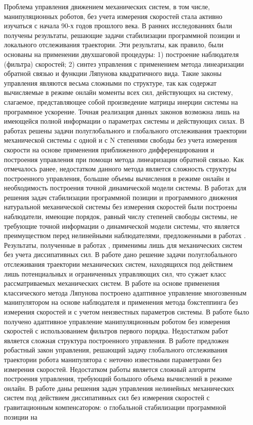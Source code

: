 {	Проблема управления движением механических систем, в том числе, манипуляционных роботов, без учета измерения скоростей стала активно изучаться с начала 90-х годов прошлого века. В ранних исследованиях \cite{nicosia90, berghuis91, kelly93, berghuis93_1, berghuis93_2} были получены результаты, решающие задачи стабилизации программной позиции и локального отслеживания траектории. Эти результаты, как правило, были основаны на применении двухшаговой процедуры: 1) построение наблюдателя (фильтра) скоростей; 2) синтез управления с применением метода линеаризации обратной связью и функции Ляпунова квадратичного вида. Такие законы управления являются весьма сложными по структуре, так как содержат вычисляемые в режиме онлайн моменты всех сил, действующих на систему, слагаемое, представляющее собой произведение матрицы инерции системы на программное ускорение. Точная реализация данных законов возможна лишь на имеющейся полной информации о параметрах системы и действующих силах. В работах \cite{loria95, loria96} решены задачи полуглобального и глобального отслеживания траектории механической системы с одной и с N степенями свободы без учета измерения скорости на основе применения приближенного дифференцирования и построения управления при помощи метода линеаризации обратной связью. Как отмечалось ранее, недостатком данного метода является сложность структуры построенного управления, большие объемы вычисления в режиме онлайн и необходимость построения точной динамической модели системы. В работах \cite{burkov95, burkov98} для решения задач стабилизации программной позиции и программного движения натуральной механической системы без измерения скоростей были построены наблюдатели, имеющие порядок, равный числу степеней свободы системы, не требующие точной информации о динамической модели системы, что является преимуществом перед нелинейными наблюдателями, предложенными в работах \cite{nicosia90, berghuis91}. Результаты, полученные в работах \cite{burkov95, burkov98}, применимы лишь для механических систем без учета диссипативных сил. В работе \cite{loria98} дано решение задачи полуглобального отслеживания траектории механических систем, находящихся под действием лишь потенциальных и ограниченных управляющих сил, что сужает класс рассматриваемых механических систем. В работе \cite{calugi02} на основе применения классического метода Ляпунова построено адаптивное управление многозвенным манипулятором на основе наблюдателя и применения метода бэкстеппинга без измерения скоростей и с учетом неизвестных параметров системы. В работе \cite{alonge03} было получено адаптивное управление манипуляционным роботом без измерения скоростей с использованием фильтров первого порядка. Недостатком работ \cite{calugi02, alonge03} является сложная структура построенного управления. В работе \cite{dixon04} предложен робастный закон управления, решающий задачу глобального отслеживания траектории робота манипулятора с неточно известными параметрами без измерения скоростей. Недостатком работы является сложный алгоритм построения управления, требующий большого объема вычислений в режиме онлайн. В работе \cite{nunes08} даны решения задач управления нелинейных механических систем под действием диссипативных сил без измерения скоростей с гравитационным компенсатором: о глобальной стабилизации программной позиции на }

